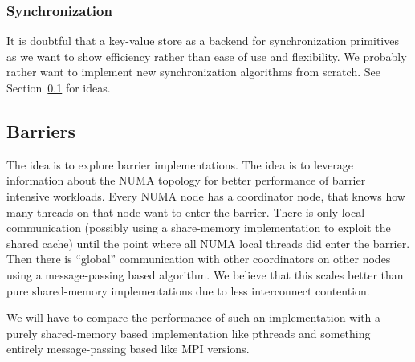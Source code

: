 \documentclass{article}
\begin{document}
\subsubsection{Synchronization}

It is doubtful that a key-value store as a backend for synchronization
primitives as we want to show efficiency rather than ease of use and
flexibility. We probably rather want to implement new synchronization
algorithms from scratch. See Section~\ref{barriers} for ideas.

\subsection{Barriers}
\label{barriers}

The idea is to explore barrier implementations. The idea is to
leverage information about the NUMA topology for better performance of
barrier intensive workloads. Every NUMA node has a coordinator node,
that knows how many threads on that node want to enter the
barrier. There is only local communication (possibly using a
share-memory implementation to exploit the shared cache) until the
point where all NUMA local threads did enter the barrier.  Then there
is ``global'' communication with other coordinators on other nodes
using a message-passing based algorithm. We believe that this scales
better than pure shared-memory implementations due to less
interconnect contention.

We will have to compare the performance of such an implementation with
a purely shared-memory based implementation like pthreads and
something entirely message-passing based like MPI versions.

\newpage



\label{LastPage}
\end{document}
